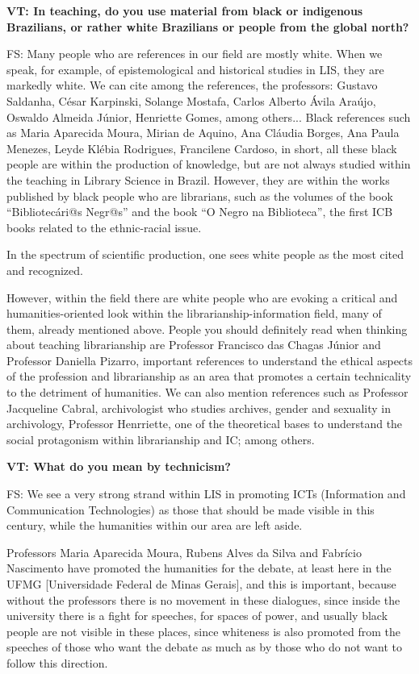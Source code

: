 \documentclass[a4paper,
fontsize=11pt,
oneside,
numbers=noperiodatend,
parskip=half-,
bibliography=totoc,
final
]{scrartcl}
\begin{document}
\textbf{VT: In teaching, do you use material from black or indigenous
Brazilians, or rather white Brazilians or people from the global north?}

FS: Many people who are references in our field are mostly white. When
we speak, for example, of epistemological and historical studies in LIS,
they are markedly white. We can cite among the references, the
professors: Gustavo Saldanha, César Karpinski, Solange Mostafa, Carlos
Alberto Ávila Araújo, Oswaldo Almeida Júnior, Henriette Gomes, among
others... Black references such as Maria Aparecida Moura, Mirian de
Aquino, Ana Cláudia Borges, Ana Paula Menezes, Leyde Klébia Rodrigues,
Francilene Cardoso, in short, all these black people are within the
production of knowledge, but are not always studied within the teaching
in Library Science in Brazil. However, they are within the works
published by black people who are librarians, such as the volumes of the
book \enquote{Bibliotecári@s Negr@s} and the book \enquote{O Negro na Biblioteca}, the
first ICB books related to the ethnic-racial issue.

In the spectrum of scientific production, one sees white people as the
most cited and recognized.

However, within the field there are white people who are evoking a
critical and humanities-oriented look within the
librarianship-information field, many of them, already mentioned above.
People you should definitely read when thinking about teaching
librarianship are Professor Francisco das Chagas Júnior and Professor
Daniella Pizarro, important references to understand the ethical aspects
of the profession and librarianship as an area that promotes a certain
technicality to the detriment of humanities. We can also mention
references such as Professor Jacqueline Cabral, archivologist who
studies archives, gender and sexuality in archivology, Professor
Henrriette, one of the theoretical bases to understand the social
protagonism within librarianship and IC; among others.

\textbf{VT: What do you mean by technicism?}

FS: We see a very strong strand within LIS in promoting ICTs
(Information and Communication Technologies) as those that should be
made visible in this century, while the humanities within our area are
left aside.

Professors Maria Aparecida Moura, Rubens Alves da Silva and Fabrício
Nascimento have promoted the humanities for the debate, at least here in
the UFMG {[}Universidade Federal de Minas Gerais{]}, and this is
important, because without the professors there is no movement in these
dialogues, since inside the university there is a fight for speeches,
for spaces of power, and usually black people are not visible in these
places, since whiteness is also promoted from the speeches of those who
want the debate as much as by those who do not want to follow this
direction.
\end{document}
